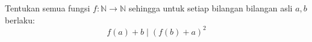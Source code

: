 Tentukan semua fungsi $f : \mathbb{N} \to \mathbb{N}$ sehingga untuk setiap bilangan bilangan asli $a, b$ berlaku:
\[
f(a)+b \mid (f(b)+a)^2
\]